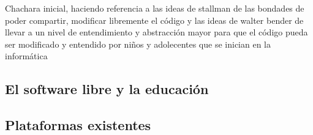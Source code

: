 Chachara inicial, haciendo referencia a las ideas de stallman de las bondades de poder compartir, modificar libremente el código y las ideas de walter bender de llevar a un nivel de entendimiento y abstracción mayor para que el código pueda ser modificado y entendido por niños y adolecentes que se inician en la inform\'atica
\subsection{El software libre y la educaci\'on}
\label{soflyedu}

\subsection{Plataformas existentes}

